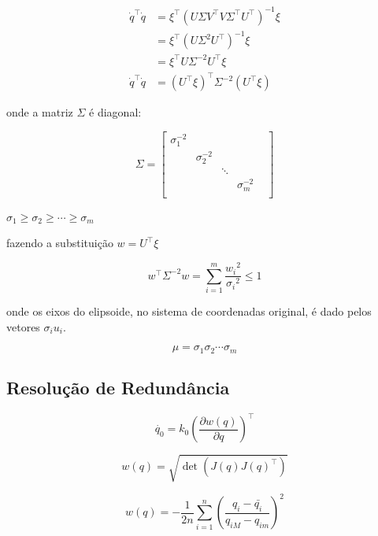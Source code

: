 \begin{align*}
    \dot{q}^\top \dot{q} & = \xi^\top {(U \Sigma V^\top V \Sigma^\top U^\top)}^{-1} \xi \\
                         & = \xi^\top {(U \Sigma^2 U^\top)}^{-1} \xi                    \\
                         & = \xi^\top U \Sigma^{-2} U^\top \xi                          \\
    \dot{q}^\top \dot{q} & = {(U^\top \xi)}^\top \Sigma^{-2} (U^\top \xi)
\end{align*}

onde a matriz \(\Sigma\) é diagonal:

\begin{equation}
    \Sigma = \begin{bmatrix}
        \sigma_1^{-2} &               &        &               & \\
                      & \sigma_2^{-2} &        &               & \\
                      &               & \ddots &               & \\
                      &               &        & \sigma_m^{-2} & \\
    \end{bmatrix}
\end{equation}

\(\sigma_1 \geq \sigma_2 \geq \cdots \geq \sigma_m\)

fazendo a substituição \(w = U^\top \xi\)

\begin{equation}
    w^\top \Sigma^{-2} w = \sum_{i=1}^m{\frac{{w_i}^2}{{\sigma_i}^2}} \leq 1
\end{equation}

onde os eixos do elipsoide, no sistema de coordenadas original, é dado pelos
vetores \(\sigma_i u_i\).

\begin{equation}
    \mu = \sigma_1 \sigma_2 \cdots \sigma_m
\end{equation}

\subsection{Resolução de Redundância}

\begin{equation}
    \dot{q_0} = k_0 {\left( \frac{\partial w(q)}{\partial q} \right)}^\top
\end{equation}

\begin{equation}
    w(q) = \sqrt{\det(J(q){J(q)}^\top)}
\end{equation}

\begin{equation}
    w(q) = -\frac{1}{2n} \sum_{i=1}^{n}{{\left(\frac{q_i - \bar{q_i}}{q_{iM} - q_{im}}\right)}^2}
\end{equation}

